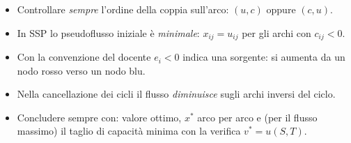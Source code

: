 \documentclass[11pt,a4paper]{article}
\begin{document}
\vspace{4mm}
\begin{tcolorbox}[colback=neg!7,colframe=neg!60!black,title=Promemoria finale]
\begin{itemize}[nosep]
  \item Controllare \emph{sempre} l'ordine della coppia sull'arco: $(u,c)$ oppure $(c,u)$.
  \item In SSP lo pseudoflusso iniziale è \emph{minimale}: $x_{ij}=u_{ij}$ per gli archi con $c_{ij}<0$.
  \item Con la convenzione del docente $e_i<0$ indica una sorgente: si aumenta da un nodo rosso
        verso un nodo blu.
  \item Nella cancellazione dei cicli il flusso \emph{diminuisce} sugli archi inversi del ciclo.
  \item Concludere sempre con: valore ottimo, $x^\ast$ arco per arco e (per il flusso massimo)
        il taglio di capacità minima con la verifica $v^\ast=u(S,T)$.
\end{itemize}
\end{tcolorbox}
\end{document}
